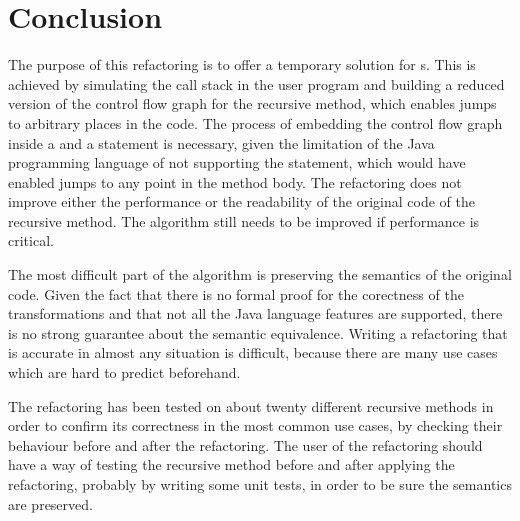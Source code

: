 \chapter{Conclusion}

%

The purpose of this refactoring is to offer a temporary solution for s. This is achieved by
simulating the call stack in the user program and building a reduced version of the control flow graph for the recursive
method, which enables jumps to arbitrary places in the code. The process of embedding the control flow graph inside
a  and a  statement is necessary, given the limitation of the Java programming language of not
supporting the  statement, which would have enabled jumps to any point in the method body. The refactoring
does not improve either the performance or the readability of the original code of the recursive method. The algorithm
still needs to be improved if performance is critical.

The most difficult part of the algorithm is preserving the semantics of the original code. Given the fact that there is
no formal proof for the corectness of the transformations and that not all the Java language features are supported,
there is no strong guarantee about the semantic equivalence. Writing a refactoring that is accurate in almost any
situation is difficult, because there are many use cases which are hard to predict beforehand.

The refactoring has been tested on about twenty different recursive methods in order to confirm its correctness in the
most common use cases, by checking their behaviour before and after the refactoring. The user of the refactoring should
have a way of testing the recursive method before and after applying the refactoring, probably by writing some unit
tests, in order to be sure the semantics are preserved.